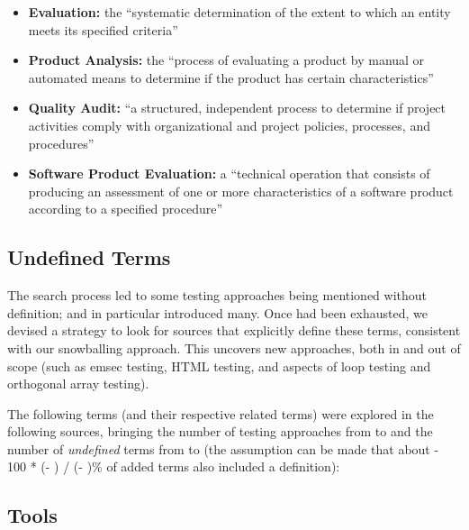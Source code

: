     \begin{itemize}
        \item \textbf{Evaluation:} the ``systematic determination of the extent
              to which an entity meets its specified criteria''
              \citep[p.~167]{IEEE2017}
        \item \textbf{Product Analysis:} the ``process of evaluating a product by
              manual or automated means to determine if the product has certain
              characteristics'' \citep[p.~343]{IEEE2017}
        \item \textbf{Quality Audit:} ``a structured, independent process to
              determine if project activities comply with organizational and
              project policies, processes, and procedures'' \citep[p.~361]{IEEE2017}
        \item \textbf{Software Product Evaluation:} a ``technical operation that
              consists of producing an assessment of one or more characteristics
              of a software product according to a specified procedure''
              \citep[p.~424]{IEEE2017}
    \end{itemize}
\fi
\subsection{Undefined Terms}
\label{undef-terms}

The search process led to some testing approaches being
mentioned without definition;
\citep{IEEE2022} and \citep{Firesmith2015} in particular introduced many.
Once \stds{} had been exhausted, we devised a strategy to
look for sources that explicitly define these terms, consistent with
our snowballing approach. This uncovers new approaches, both in and out of
scope (such as \acf{emsec} testing, HTML testing, and aspects of loop testing and
orthogonal array testing).

The following terms (and their respective related terms) were explored%
\ifnotpaper in the following sources\fi, bringing the number of testing
approaches from \the\TotalBefore{} to \the\TotalAfter{} and the number of
\emph{undefined} terms from \the\UndefBefore{} to \the\UndefAfter{} (the
assumption can be made that about \the{} - 100 * (\UndefAfter -
\UndefBefore) / (\TotalAfter - \TotalBefore)\relax\% of added terms also
included a definition):



\ifnotpaper\else
    \ieeeTestTermsTable{}  %
    \subsection{Tools}  %
    \graphGenDesc{}
\fi

